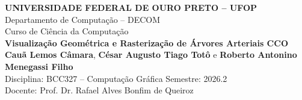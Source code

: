 \begin{center}
  {\large\textbf{UNIVERSIDADE FEDERAL DE OURO PRETO -- UFOP}}\\
  {\small Departamento de Computação -- DECOM\\
  Curso de Ciência da Computação}\\[0.55cm]
  {\LARGE\bfseries\textcolor{ufopred}{Visualização Geométrica e Rasterização de Árvores Arteriais CCO}}\\[0.35cm]
  {\large
  \textbf{Cauã Lemos Câmara},
  \textbf{César Augusto Tiago Totô} e
  \textbf{Roberto Antonino Menegassi Filho}}\\[0.15cm]
  {\small Disciplina: BCC327 -- Computação Gráfica \quad Semestre: 2026.2\\
  Docente: Prof. Dr. Rafael Alves Bonfim de Queiroz}
\end{center}